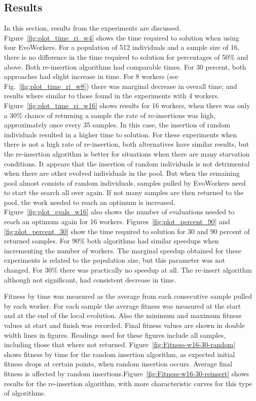 \documentclass{llncs}
\begin{document}
\subsection{Results}
In this section, results from the experiments are discussed. 
Figure~\ref{fig:plot_time_ri_w4} shows the time required 
to solution when using four EvoWorkers. For a population of
512 individuals and a sample size of 16, there is no
difference in the time required to solution for 
percentages of 50\% and above. Both re-insertion algorithms
had comparable times. For 30 percent, both approaches 
had slight increase in time. For 8 workers 
(see Fig.~\ref{fig:plot_time_ri_w8})  there was marginal
decrease in overall time; and results where 
similar to those found in the experiments with 4 workers.  
Figure~\ref{fig:plot_time_ri_w16} shows results for 16 workers,
when there was only a 30\% chance of returning a sample 
the rate of re-insertions was high, approximately once every 35
samples. In this case, the insertion of random individuals 
resulted in a higher time to solution. For these experiments
when there is not a high rate of re-insertion, both alternatives
have similar results, but the re-insertion algorithm is better
for situations when there are many starvation conditions. It appears
that the insertion of random individuals is not detrimental when there
are other evolved individuals in the pool. But when the remaining
pool almost consists of random individuals, samples pulled by
EvoWorkers need to start the search all over again. 
If not many samples are then returned to the pool, the work needed to reach an
optimum is increased. Figure~\ref{fig:plot_evals_w16} also shows the number 
of evaluations needed to reach an optimum again for 16 workers.
Figures~\ref{fig:plot_percent_90} and \ref{fig:plot_percent_30} show
the time required to solution for 30 and 90 percent of returned samples.
For 90\% both algorithms had similar speedups when incrementing the number of
workers. The marginal speedup obtained for these experiments is related to 
the population size, but this parameter was not changed. For 30\% 
there was practically no speedup at all. The re-insert algorithm
although not significant, had consistent decrease in time.         

Fitness by time was measured as the average from each consecutive
sample pulled by each worker. For each sample the average fitness
was measured at the start and at the end of the local evolution.
Also the minimum and maximum fitness values at start and finish was 
recorded. Final fitness values are shown in double width lines in figures.
Readings used for these figures include all samples, including
those that where not returned.   
Figure~\ref{fig:Fitness-w16-30-random} shows fitness by time
for the random insertion algorithm, as expected initial fitness drops
at certain points, when random insertion occurs. Average final fitness 
is affected by random insertions.Figure~\ref{fig:Fitness-w16-30-reinsert}
shows results for the re-insertion algorithm, with more
characteristic curves for this type of algorithms. 
 
\end{document}

